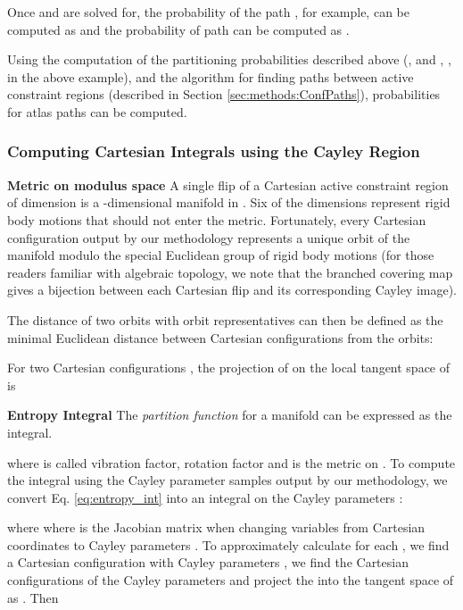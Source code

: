 \documentclass[]{article}
\begin{document}
Once  and  are solved for, the probability of the path , for example, 
can be computed as  and
the probability of path  can be computed as .

Using the computation of the partitioning probabilities described above (,  and
, ,  in the above example), and the algorithm for
finding paths between active constraint regions (described in Section
\ref{sec:methods:ConfPaths}), probabilities for atlas paths can be computed. 

\subsubsection{Computing Cartesian Integrals using the Cayley Region}
\label{sec:methods:exactVolume}
\noindent\textbf{Metric on modulus space} A single flip  of a Cartesian active
constraint region of dimension  is a -dimensional manifold  in
. Six of the dimensions represent rigid body motions that should not
enter the metric. Fortunately, every Cartesian configuration 
output by our methodology represents a unique orbit  of the
manifold modulo the special Euclidean group  of rigid body motions 
(for those readers familiar with algebraic topology, we note that the
branched covering map gives a bijection between each Cartesian flip and its
corresponding Cayley image).

The distance of two orbits  with orbit
representatives  can then be defined as the minimal Euclidean
distance between Cartesian configurations from the orbits:



For two Cartesian configurations , the projection 
of  on the local tangent space of  is



\noindent\textbf{Entropy Integral} The \emph{partition function} for a manifold can be expressed as the
integral\cite{Holmes-Cerfon2013}.




\noindent where  is called vibration factor,  rotation factor and
 is the metric on . To compute the integral using the Cayley parameter samples output by our
methodology, we convert Eq. \eqref{eq:entropy_int} into an integral on the Cayley parameters
:




\noindent where  where is the Jacobian matrix when changing variables from Cartesian
coordinates  to Cayley parameters . To approximately calculate 
for each , we find a Cartesian configuration  with Cayley parameters , we find the
Cartesian configurations  of the Cayley parameters  and project the  into the tangent space
of  as . Then 
\end{document}
